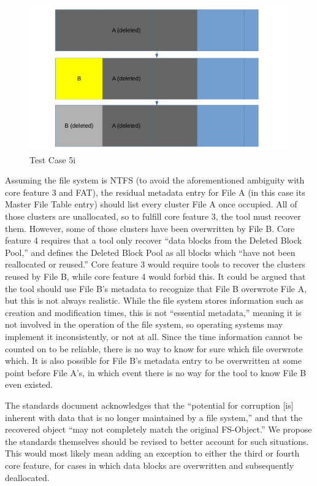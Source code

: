\begin{figure}[h]
    \centering
    \includegraphics[width=\linewidth]{fig/case5i.png}
    \caption{Test Case 5i}
    \label{fig:case_5i}
\end{figure}

Assuming the file system is NTFS (to avoid the aforementioned ambiguity with core feature 3 and FAT), the residual metadata entry for File A (in this case its Master File Table entry) should list every cluster File A once occupied. 
All of those clusters are unallocated, so to fulfill core feature 3, the tool must recover them. 
However, some of those clusters have been overwritten by File B. Core feature 4 requires that a tool only recover ``data blocks from the Deleted Block Pool,''\cite{meta:dfr:standards} and defines the Deleted Block Pool as all blocks which ``have not been reallocated or reused.''\cite{meta:dfr:standards}
Core feature 3 would require tools to recover the clusters reused by File B, while core feature 4 would forbid this. 
It could be argued that the tool should use File B's metadata to recognize that File B overwrote File A, but this is not always realistic. 
While the file system stores information such as creation and modification times, this is not ``essential metadata,'' meaning it is not involved in the operation of the file system, so operating systems may implement it inconsistently, or not at all.\cite{carrier:filesystems}
Since the time information cannot be counted on to be reliable, there is no way to know for sure which file overwrote which. 
It is also possible for File B's metadata entry to be overwritten at some point before File A's, in which event there is no way for the tool to know File B even existed.

The standards document acknowledges that the ``potential for corruption [is] inherent with data that is no longer maintained by a file system,''\cite{meta:dfr:standards} and that the recovered object ``may not completely match the original FS-Object.''\cite{meta:dfr:standards}
We propose the standards themselves should be revised to better account for such situations.
This would most likely mean adding an exception to either the third or fourth core feature, for cases in which data blocks are overwritten and subsequently deallocated.

